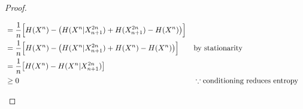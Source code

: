 \documentclass[
  coursecode={MTHE 474},
  assignmentname={Homework \homeworknumber},
  studentnumber=20053722,
  name={Bryan Hoang},
  draft,
]{
  ltxanswer%
}
\begin{document}
\begin{questions}
\begin{parts}
\begin{subparts}
\begin{solution}
\begin{proof}
\begin{proofpart}
\begin{align*}
                 &= \frac{1}{n} \Bigl[H(X^{n}) - \bigl(H(X^{n}|X_{n+1}^{2n}) + H(X_{n+1}^{2n}) - H(X^{n})\bigr) \Bigr]                                                 \\
                 &= \frac{1}{n} \Bigl[H(X^{n}) - \bigl(H(X^{n}|X_{n+1}^{2n}) + H(X^{n}) - H(X^{n})\bigr) \Bigr]        & &\text{by stationarity}                       \\
                 &= \frac{1}{n} \bigl[H(X^{n}) - H(X^{n}|X_{n+1}^{2n})\bigr]                                                                                           \\
                 &\ge 0                                                                                                & &\because \text{conditioning reduces entropy}
              \end{align*}
            \end{proofpart}
          \end{proof}
        \end{solution}
      \end{subparts}
    \end{parts}
  \end{questions}
\end{document}

